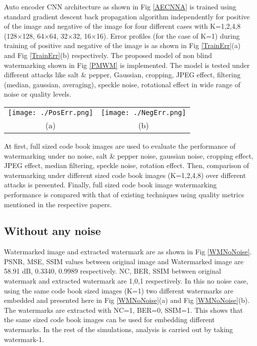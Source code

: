 Auto encoder CNN architecture as shown in Fig \ref{AECNNA} is trained using standard gradient descent back propagation algorithm independently for positive of the image and negative of the image for four different cases with K=1,2,4,8 (128$\times$128, 64$\times$64, 32$\times$32, 16$\times$16). Error profiles (for the case of K=1) during training of positive and negative of the image is as shown in Fig \ref{TrainErr}(a) and Fig \ref{TrainErr}(b) respectively. The proposed model of non blind watermarking shown in Fig \ref{PMWM} is implemented. The model is tested under different attacks like salt $\&$ pepper, Gaussian, cropping, JPEG effect, filtering (median, gaussian, averaging), speckle noise, rotational effect in wide range of noise or quality levels. \\

\begin{figure*}
\begin{tabular}{cc}
\texttt{[image: ./PosErr.png]}&\texttt{[image: ./NegErr.png]}\\
(a)  & (b) \\

\end{tabular}
\caption{(a) Training Error for Positive of the Image, (b) Training Error for Negative of the Image }
\label{TrainErr}

\end{figure*}

At first, full sized code book images are used to evaluate the performance of watermarking under no noise, salt \& pepper noise, gaussian noise, cropping effect, JPEG effect, median filtering, speckle noise, rotation effect. Then, comparison of watermarking under different sized code book images (K=1,2,4,8) over different attacks is presented. Finally, full sized code book image watermarking performance is compared with that of existing techniques using quality metrics mentioned in the respective papers. 
\subsection{Without any noise}

Watermarked image and extracted watermark are as shown in Fig \ref{WMNoNoise}. PSNR, MSE, SSIM values between original image and Watermarked image are 58.91 dB, 0.3340, 0.9989 respectively. NC, BER, SSIM between original watermark and extracted watermark are 1,0,1 respectively. In this no noise case, using the same code book sized images (K=1) two different watermarks are embedded and presented here in Fig \ref{WMNoNoise}(a) and Fig \ref{WMNoNoise}(b). The watermarks are extracted with NC=1, BER=0, SSIM=1. This shows that the same sized code book images can be used for embedding different watermarks. In the rest of the simulations, analysis is carried out by taking watermark-1.\\

